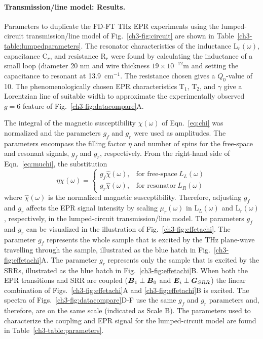 \noindent \paragraph*{Transmission\-/line model: Results.} Parameters to duplicate the FD-FT THz EPR experiments using the lumped-circuit transmission\-/line model of Fig.~\ref{ch3-fig:circuit} are shown in Table~\ref{ch3-table:lumpedparameters}. The resonator characteristics of the inductance L$_r(\omega)$, capacitance C$_r$, and resistance R$_r$ were found by calculating the inductance of a small loop (diameter 20 nm and wire thickness $19 \times 10^{-12}$m and setting the capacitance to resonant at 13.9~cm$^{-1}$. The resistance chosen gives a $Q_0$-value of 10. The phenomenologically chosen EPR characteristics T$_1$, T$_2$, and $\gamma$ give a Lorentzian line of suitable width to approximate the experimentally observed $g = 6$ feature of Fig.~\ref{ch3-fig:datacompare}A. 

The integral of the magnetic susceptibility $\chi(\omega)$ of Eqn.~\ref{eq:chi} was normalized and the parameters $g_f$ and $g_r$ were used as amplitudes. The parameters encompass the filling factor $\eta$ and number of spins for the free-space and resonant signals, $g_f$ and $g_r$, respectively. From the right-hand side of Eqn.~\ref{eq:muchi}, the substitution
\begin{equation}
    \eta \chi(\omega) =
    \begin{cases}
      g_f \hat{\chi}(\omega), & \text{for free-space}\ L_L(\omega) \\
      g_r \hat{\chi}(\omega), & \text{for resonator}\ L_R(\omega)
    \end{cases}
\end{equation}\label{etagfgr}
where $\hat{\chi}(\omega)$ is the normalized magnetic susceptibility. Therefore, adjusting  $g_f$ and $g_r$ affects the EPR signal intensity by scaling $\mu_r(\omega)$ in L$_L(\omega)$ and L$_r(\omega)$, respectively, in the lumped-circuit transmission\-/line model. The parameters $g_f$ and $g_r$ can be visualized in the illustration of Fig.~\ref{ch3-fig:effetachi}. The parameter $g_f$ represents the whole sample that is excited by the THz plane-wave travelling through the sample, illustrated as the blue hatch in Fig.~\ref{ch3-fig:effetachi}A. The parameter $g_r$ represents only the sample that is excited by the SRRs, illustrated as the blue hatch in Fig.~\ref{ch3-fig:effetachi}B. When both the EPR transitions and SRR are coupled ($\boldsymbol{B}_{1}\perp\boldsymbol{B}_{0}$ and $\boldsymbol{E}_{i}\perp\boldsymbol{G}_{SRR}$) the linear combination of Figs.~\ref{ch3-fig:effetachi}A and \ref{ch3-fig:effetachi}B is excited. The spectra of Figs.~\ref{ch3-fig:datacompare}D-F use the same $g_f$ and $g_r$ parameters and, therefore, are on the same scale (indicated as Scale B). The parameters used to characterize the coupling and EPR signal for the lumped-circuit model are found in Table~\ref{ch3-table:parameters}.

